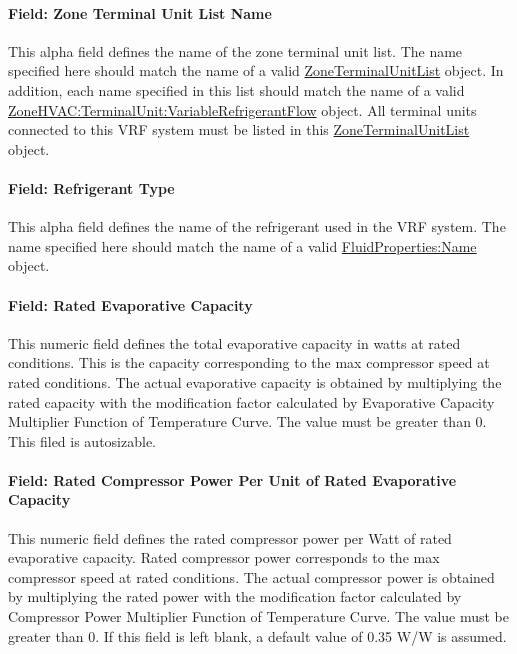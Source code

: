 \paragraph{Field: Zone Terminal Unit List Name}

This alpha field defines the name of the zone terminal unit list. The name specified here should match the name of a valid \hyperref[zoneterminalunitlist]{ZoneTerminalUnitList} object. In addition, each name specified in this list should match the name of a valid \hyperref[zonehvacterminalunitvariablerefrigerantflow]{ZoneHVAC:TerminalUnit:VariableRefrigerantFlow} object. All terminal units connected to this VRF system must be listed in this \hyperref[zoneterminalunitlist]{ZoneTerminalUnitList} object.

\paragraph{Field: Refrigerant Type}

This alpha field defines the name of the refrigerant used in the VRF system. The name specified here should match the name of a valid \hyperref[fluidpropertiesname]{FluidProperties:Name} object.

\paragraph{Field: Rated Evaporative Capacity}

This numeric field defines the total evaporative capacity in watts at rated conditions. This is the capacity corresponding to the max compressor speed at rated conditions. The actual evaporative capacity is obtained by multiplying the rated capacity with the modification factor calculated by Evaporative Capacity Multiplier Function of Temperature Curve. The value must be greater than 0. This filed is autosizable.

\paragraph{Field: Rated Compressor Power Per Unit of Rated Evaporative Capacity}

This numeric field defines the rated compressor power per Watt of rated evaporative capacity. Rated compressor power corresponds to the max compressor speed at rated conditions. The actual compressor power is obtained by multiplying the rated power with the modification factor calculated by Compressor Power Multiplier Function of Temperature Curve. The value must be greater than 0. If this field is left blank, a default value of 0.35 W/W is assumed.

